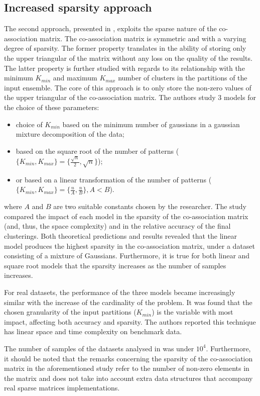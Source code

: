 \subsection{Increased sparsity approach}
The second approach, presented in \cite{Lourenco2010}, exploits the sparse nature of the co-association matrix.
The co-association matrix is symmetric and with a varying degree of sparsity.
The former property translates in the ability of storing only the upper triangular of the matrix without any loss on the quality of the results.
The latter property is further studied with regards to its relationship with the minimum $K_{min}$ and maximum $K_{max}$ number of clusters in the partitions of the input ensemble.
The core of this approach is to only store the non-zero values of the upper triangular of the co-association matrix.
The authors study 3 models for the choice of these parameters:

\begin{itemize}
	\item choice of $K_{min}$ based on the minimum number of gaussians in a gaussian mixture decomposition of the data;
	\item based on the square root of the number of patterns ($\{K_{min},K_{max}\} = \{\frac{\sqrt{n}}{2},\sqrt{n}\}$);
	\item or based on a linear transformation of the number of patterns ($\{K_{min},K_{max}\} = \{\frac{n}{A},\frac{n}{B}\},A<B$).
\end{itemize}

where $A$ and $B$ are two suitable constants chosen by the researcher.
The study compared the impact of each model in the sparsity of the co-association matrix (and, thus, the space complexity) and in the relative accuracy of the final clusterings.
Both theoretical predictions and results revealed that the linear model produces the highest sparsity in the co-association matrix, under a dataset consisting of a mixture of Gaussians.
Furthermore, it is true for both linear and square root models that the sparsity increases as the number of samples increases.

For real datasets, the performance of the three models became increasingly similar with the increase of the cardinality of the problem.
It was found that the chosen granularity of the input partitions ($K_{min}$) is the variable with most impact, affecting both accuracy and sparsity.
The authors reported this technique has linear space and time complexity on benchmark data.

The number of samples of the datasets analysed in \cite{Lourenco2010} was under $10^4$.
Furthermore, it should be noted that the remarks concerning the sparsity of the co-association matrix in the aforementioned study refer to the number of non-zero elements in the matrix and does not take into account extra data structures that accompany real sparse matrices implementations.

